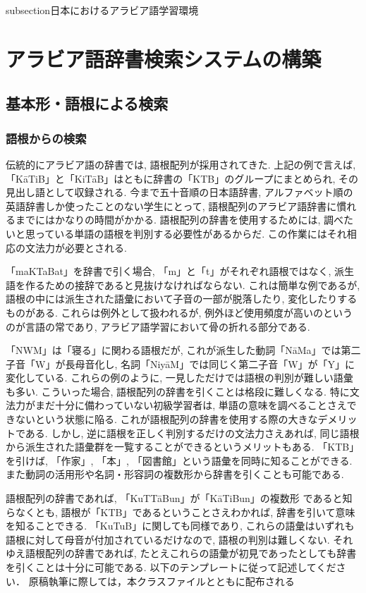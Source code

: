 \documentclass[technicalreport]{ieicej}
\begin{document}
subsection{日本におけるアラビア語学習環境}

\section{アラビア語辞書検索システムの構築}
\subsection{基本形・語根による検索}
\subsubsection{語根からの検索}
伝統的にアラビア語の辞書では, 語根配列が採用されてきた. 上記の例で言えば, 「KāTiB」と「KiTāB」はともに辞書の「KTB」のグループにまとめられ, その見出し語として収録される. 今まで五十音順の日本語辞書, アルファベット順の英語辞書しか使ったことのない学生にとって, 語根配列のアラビア語辞書に慣れるまでにはかなりの時間がかかる. 語根配列の辞書を使用するためには, 調べたいと思っている単語の語根を判別する必要性があるからだ. この作業にはそれ相応の文法力が必要とされる. 

「maKTaBat」を辞書で引く場合, 「m」と「t」がそれぞれ語根ではなく, 派生語を作るための接辞であると見抜けなければならない. これは簡単な例であるが, 語根の中には派生された語彙において子音の一部が脱落したり, 変化したりするものがある. これらは例外として扱われるが, 例外ほど使用頻度が高いのというのが言語の常であり, アラビア語学習において骨の折れる部分である. 

「NWM」は「寝る」に関わる語根だが, これが派生した動詞「NāMa」では第二子音「W」が長母音化し, 名詞「NiyāM」では同じく第二子音「W」が「Y」に変化している. これらの例のように, 一見しただけでは語根の判別が難しい語彙も多い. こういった場合, 語根配列の辞書を引くことは格段に難しくなる. 特に文法力がまだ十分に備わっていない初級学習者は, 単語の意味を調べることさえできないという状態に陥る. これが語根配列の辞書を使用する際の大きなデメリットである. 
しかし, 逆に語根を正しく判別するだけの文法力さえあれば, 同じ語根から派生された語彙群を一覧することができるというメリットもある.  「KTB」を引けば, 「作家」, 「本」, 「図書館」という語彙を同時に知ることができる. また動詞の活用形や名詞・形容詞の複数形から辞書を引くことも可能である. 

語根配列の辞書であれば, 「KuTTāBun」が「KāTiBun」の複数形 であると知らなくとも, 語根が「KTB」であるということさえわかれば, 辞書を引いて意味を知ることできる. 「KuTuB」に関しても同様であり, これらの語彙はいずれも語根に対して母音が付加されているだけなので, 語根の判別は難しくない. それゆえ語根配列の辞書であれば, たとえこれらの語彙が初見であったとしても辞書を引くことは十分に可能である. 
以下のテンプレートに従って記述してください．
原稿執筆に際しては，本クラスファイルとともに配布される
\end{document}
